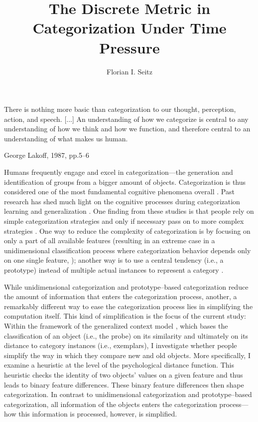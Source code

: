 \documentclass[a4paper,man,natbib]{apa6}
\title{The Discrete Metric in Categorization Under Time Pressure}
\author{Florian I. Seitz}
\affiliation{University of Basel}
\begin{document}
\maketitle

\epigraph{There is nothing more basic than categorization to our thought, perception, action, and speech. [...] An understanding of how we categorize is central to any understanding of how we think and how we function, and therefore central to an understanding of what makes us human.}{George Lakoff, 1987, pp.5--6}

Humans frequently engage and excel in categorization---the generation and identification of groups from a bigger amount of objects. Categorization is thus considered one of the most fundamental cognitive phenomena overall \citep{ashby2001categorization, bruner1956study, cohen2005bridging, lakoff1987women, goldstone2003concepts}. Past research has shed much light on the cognitive processes during categorization learning and generalization \citep[for an overview over the diverse cognitive models of categorization, see][]{kruschke2008models,wills2013models}. One finding from these studies is that people rely on simple categorization strategies and only if necessary pass on to more complex strategies \citep{gluck2002people, meeter2006strategies, meeter2008probabilistic, johansen2002there, smith1998prototypes}. One way to reduce the complexity of categorization is by focusing on only a part of all available features (resulting in an extreme case in a unidimensional classification process where categorization behavior depends only on one single feature, \citealp{johansen2002there}); another way is to use a central tendency (i.e., a prototype) instead of multiple actual instances to represent a category \citep{smith1998prototypes}. 

While unidimensional categorization and prototype--based categorization reduce the amount of information that enters the categorization process, another, a remarkably different way to ease the categorization process lies in simplifying the computation itself. This kind of simplification is the focus of the current study: Within the framework of the generalized context model \citep{nosofsky1986attention}, which bases the classification of an object (i.e., the probe) on its similarity and ultimately on its distance to category instances (i.e., exemplars), I investigate whether people simplify the way in which they compare new and old objects. 
More specifically, I examine a heuristic at the level of the psychological distance function. This heuristic checks the identity of two objects' values on a given feature and thus leads to binary feature differences. These binary feature differences then shape categorization. In contrast to unidimensional categorization and prototype--based categorization, all information of the objects enters the categorization process---how this information is processed, however, is simplified. 
\end{document}
